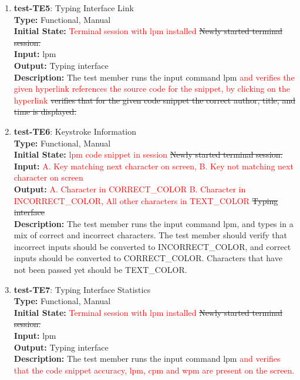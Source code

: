 \documentclass[12pt, titlepage]{article}
\begin{document}
\begin{enumerate}
\item{\textbf{test-TE5}: Typing Interface Link\\}
\textbf{Type:} Functional, Manual \\
\textbf{Initial State:} \textcolor{red}{Terminal session with lpm installed} \sout{Newly started terminal session.} \\
\textbf{Input:} lpm \\
\textbf{Output:} Typing interface \\
\textbf{Description:} The test member runs the input command lpm \textcolor{red}{and verifies the given hyperlink references the source code for the snippet, by clicking on the hyperlink} \sout{verifies that for the given code snippet the correct author, title, and time is displayed.} \\

\item{\textbf{test-TE6}: Keystroke Information\\}
\textbf{Type:} Functional, Manual \\
\textbf{Initial State:} \textcolor{red}{lpm code snippet in session} \sout{Newly started terminal session.} \\
\textbf{Input:} \textcolor{red}{A. Key matching next character on screen, B. Key not matching next character on screen}\\
\textbf{Output:} \textcolor{red}{A. Character in CORRECT\_COLOR B. Character in INCORRECT\_COLOR, All other characters in TEXT\_COLOR} \sout{Typing interface}  \\
\textbf{Description:} The test member runs the input command lpm, and types in a mix of correct and incorrect characters. The test member should verify that incorrect inputs should be converted to INCORRECT\_COLOR, and correct inputs should be converted to CORRECT\_COLOR. Characters that have not been passed yet should be TEXT\_COLOR. \\

\item{\textbf{test-TE7}: Typing Interface Statistics\\}
\textbf{Type:} Functional, Manual \\
\textbf{Initial State:} \textcolor{red}{Terminal session with lpm installed} \sout{Newly started terminal session.} \\
\textbf{Input:} lpm \\
\textbf{Output:} Typing interface \\
\textbf{Description:} The test member runs the input command lpm \textcolor{red}{and verifies that the code snippet accuracy, lpm, cpm and wpm are present on the screen.} \\


\end{enumerate}
\end{document}
